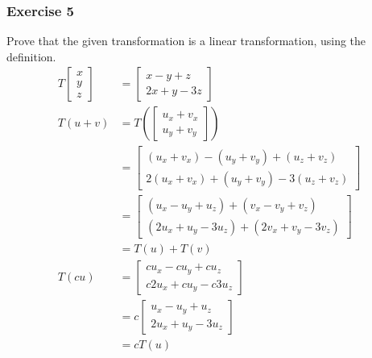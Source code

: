 \documentclass[letterpaper, 12pt]{math}
\begin{document}
\subsubsection*{Exercise 5}
Prove that the given transformation is a linear transformation, using the
definition.
\begin{align*}
  T\begin{bmatrix}x \\ y \\ z\end{bmatrix} &= \begin{bmatrix}
    x-y+z \\
    2x+y-3z
  \end{bmatrix} \\
  T(u+v) &= T\left(\begin{bmatrix}
    u_x+v_x \\
    u_y+v_y
  \end{bmatrix}\right) \\
  &= \begin{bmatrix}
    (u_x+v_x)-(u_y+v_y)+(u_z+v_z) \\
    2(u_x+v_x)+(u_y+v_y)-3(u_z+v_z)
  \end{bmatrix} \\
  &= \begin{bmatrix}
    (u_x-u_y+u_z)+(v_x-v_y+v_z) \\
    (2u_x+u_y-3u_z)+(2v_x+v_y-3v_z)
  \end{bmatrix} \\
  &= T(u)+T(v) \\
  T(cu) &= \begin{bmatrix}
    cu_x-cu_y+cu_z \\
    c2u_x+cu_y-c3u_z
  \end{bmatrix} \\
  &= c\begin{bmatrix}
    u_x-u_y+u_z \\
    2u_x+u_y-3u_z
  \end{bmatrix} \\
  &= cT(u)
\end{align*}
\end{document}
